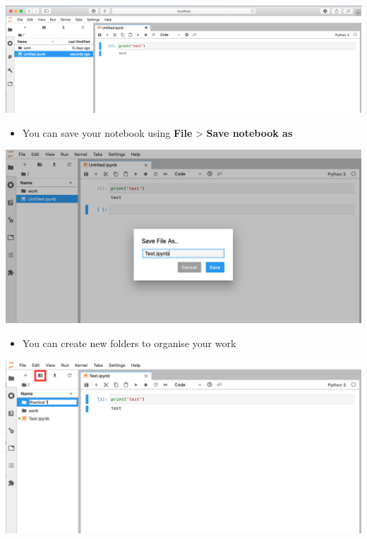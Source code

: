 \documentclass[
]{book}
\providecommand{\tightlist}{%
  \setlength{\itemsep}{0pt}\setlength{\parskip}{0pt}}
\begin{document}
\begin{center}\includegraphics[width=19.25in]{figs/chp1/Figure12} \end{center}

\begin{itemize}
\tightlist
\item
  You can save your notebook using \textbf{File} \textgreater{} \textbf{Save notebook as}
\end{itemize}

\begin{center}\includegraphics[width=14.93in]{figs/chp1/Figure13} \end{center}

\begin{itemize}
\tightlist
\item
  You can create new folders to organise your work
\end{itemize}

\begin{center}\includegraphics[width=14.99in]{figs/chp1/Figure14} \end{center}
\end{document}
